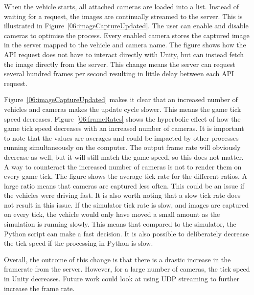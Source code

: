 When the vehicle starts, all attached cameras are loaded into a list. Instead of waiting for a request, the images are continually streamed to the server. This is illustrated in Figure~\ref{06:imageCaptureUpdated}. The user can enable and disable cameras to optimise the process. Every enabled camera stores the captured image in the server mapped to the vehicle and camera name. The figure shows how the API request does not have to interact directly with Unity, but can instead fetch the image directly from the server. This change means the server can request several hundred frames per second resulting in little delay between each API request. 

Figure~\ref{06:imageCaptureUpdated} makes it clear that an increased number of vehicles and cameras makes the update cycle slower. This means the game tick speed decreases. Figure~\ref{06:frameRates} shows the hyperbolic effect of how the game tick speed decreases with an increased number of cameras. It is important to note that the values are averages and could be impacted by other processes running simultaneously on the computer. The output frame rate will obviously decrease as well, but it will still match the game speed, so this does not matter. A way to counteract the increased number of cameras is not to render them on every game tick. The figure shows the average tick rate for the different ratios. A large ratio means that cameras are captured less often. This could be an issue if the vehicles were driving fast. It is also worth noting that a slow tick rate does not result in this issue. If the simulator tick rate is slow, and images are captured on every tick, the vehicle would only have moved a small amount as the simulation is running slowly. This means that compared to the simulator, the Python script can make a fast decision. It is also possible to deliberately decrease the tick speed if the processing in Python is slow. 

Overall, the outcome of this change is that there is a drastic increase in the framerate from the server. However, for a large number of cameras, the tick speed in Unity decreases. Future work could look at using UDP streaming to further increase the frame rate.  

